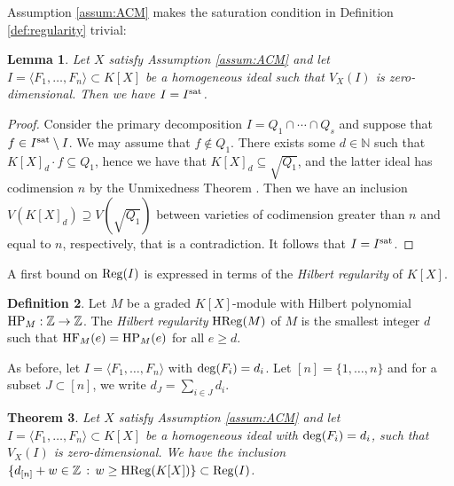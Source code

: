 \documentclass[12pt]{article}
\newtheorem{thm}{Theorem}[section]
\newtheorem{lemm}[thm]{Lemma}
\theoremstyle{definition}
\newtheorem{defn}[thm]{Definition}
\theoremstyle{remark}
\newcommand{\numberset}{\mathbb}
\newcommand{\N}{\numberset{N}}
\begin{document}
Assumption \ref{assum:ACM} makes the saturation condition in Definition \ref{def:regularity} trivial: 
\begin{lemm} \label{lem:IisIsat}
Let $X$ satisfy Assumption \ref{assum:ACM} and let $I = \langle F_1, \ldots, F_n \rangle \subset K[X] $ be a homogeneous ideal such that $V_X(I)$ is zero-dimensional. Then we have $I=I^{\rm sat}$.
\end{lemm}
\begin{proof}
Consider the primary decomposition $I=Q_1 \cap \cdots \cap Q_s$ and suppose that $f\in I^{\rm sat}\setminus I $. We may assume that $f\not\in Q_1$. There exists some $d\in \N$ such that $K[X]_d\cdot f\subseteq Q_1$, hence we have that $K[X]_d\subseteq \sqrt{Q_1}$, and the latter ideal has codimension $n$ by the Unmixedness Theorem \cite[Corollary 18.14]{eisenbud1995commutative}. Then we have an inclusion $V(K[X]_d)\supseteq V(\sqrt{Q_1})$ between varieties of codimension greater than $n$ and equal to $n$, respectively, that is a contradiction. It follows that $I=I^{\rm sat}$.
\end{proof}
A first bound on ${\rm Reg}(I)$ is expressed in terms of the \emph{Hilbert regularity} of $K[X]$.
\begin{defn}\label{def:hilbreg}
Let $M$ be a graded $K[X]$-module with Hilbert polynomial ${\rm HP}_M:\mathbb{Z} \rightarrow \mathbb{Z}$. The \emph{Hilbert regularity} ${\rm HReg}(M)$ of $M$ is the smallest integer $d$ such that ${\rm HF}_M(e) = {\rm HP}_M(e)$ for all $e \geq d$.
\end{defn}
As before, let $I = \langle F_1, \ldots, F_n \rangle$ with ${\rm deg}(F_i) = d_i$. Let $[n] = \{ 1, \ldots, n \}$ and for a subset $J \subset [n]$, we write $d_J = \sum_{i \in J} d_i$. 
\begin{thm} \label{thm:regfromhreg}
    Let $X$ satisfy Assumption \ref{assum:ACM} and let $I = \langle F_1, \ldots, F_n \rangle \subset K[X]$ be a homogeneous ideal with ${\rm deg}(F_i) = d_i$, such that $V_X(I)$ is zero-dimensional. We have the inclusion $\{d_{[n]} + w \in \mathbb{Z} \, : \, w \geq {\rm HReg}(K[X]) \} \subset {\rm Reg}(I)$.
\end{thm}
\end{document}
